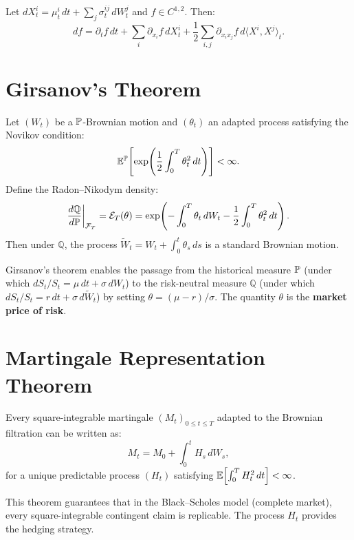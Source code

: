 \begin{theorem}
Let $dX_t^i = \mu_t^i\,dt + \sum_j \sigma_t^{ij}\,dW_t^j$ and
$f \in C^{1,2}$. Then:
\[
    df = \partial_t f\,dt + \sum_i \partial_{x_i}f\,dX_t^i
    + \frac{1}{2}\sum_{i,j}\partial_{x_i x_j}f\,
    d\langle X^i, X^j\rangle_t.
\]
\end{theorem}

\section{Girsanov's Theorem}

\begin{theorem}[Girsanov]
\label{thm:girsanov}
Let $(W_t)$ be a $\mathbb{P}$-Brownian motion and $(\theta_t)$ an adapted process
satisfying the Novikov condition:
\[
    \mathbb{E}^{\mathbb{P}}\!\left[\exp\!\left(\frac{1}{2}\int_0^T \theta_t^2\,dt\right)\right]
    < \infty.
\]
Define the Radon--Nikodym density:
\[
    \frac{d\mathbb{Q}}{d\mathbb{P}}\bigg|_{\mathcal{F}_T}
    = \mathcal{E}_T(\theta) = \exp\!\left(-\int_0^T \theta_t\,dW_t
    - \frac{1}{2}\int_0^T \theta_t^2\,dt\right).
\]
Then under $\mathbb{Q}$, the process
$\tilde{W}_t = W_t + \int_0^t \theta_s\,ds$
is a standard Brownian motion.
\end{theorem}

\begin{intuition}[title=\textbf{Application to Finance}]
Girsanov's theorem enables the passage from the historical measure $\mathbb{P}$
(under which $dS_t/S_t = \mu\,dt + \sigma\,dW_t$) to the risk-neutral
measure $\mathbb{Q}$ (under which $dS_t/S_t = r\,dt +
\sigma\,d\tilde{W}_t$) by setting $\theta = (\mu - r)/\sigma$.
The quantity $\theta$ is the \textbf{market price of risk}.
\end{intuition}

\section{Martingale Representation Theorem}

\begin{theorem}
\label{thm:representation}
Every square-integrable martingale $(M_t)_{0 \leq t \leq T}$ adapted to
the Brownian filtration can be written as:
\[
    M_t = M_0 + \int_0^t H_s\,dW_s,
\]
for a unique predictable process $(H_t)$ satisfying
$\mathbb{E}\!\left[\int_0^T H_t^2\,dt\right] < \infty$.
\end{theorem}

\begin{remark}
This theorem guarantees that in the Black--Scholes model (complete market),
every square-integrable contingent claim is replicable. The process $H_t$
provides the hedging strategy.
\end{remark}

